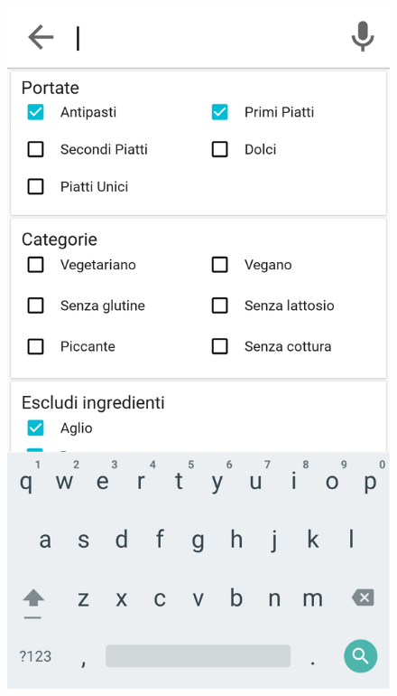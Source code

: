 \begin{figure}[H]
\begin{minipage}{.49\textwidth}
		\includegraphics[width=\textwidth]{img/wireframe/search_page_clicca_tastiera.png}
	\end{minipage}
\end{figure}
